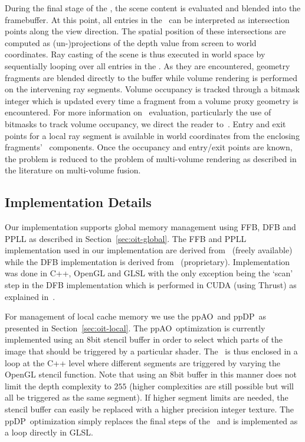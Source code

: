 \documentclass{egpubl}
\newcommand{\ab}{\mbox{A-buffer}}
\newcommand{\stencil}{ppAO}
\newcommand{\dloop}{ppDP}
\begin{document}
During the final stage of the \sResolve, the scene content is evaluated and blended into the framebuffer. 
At this point, all entries in the \bFraglist\ can be interpreted as intersection points along the view direction. 
The spatial position of these intersections are computed as (un-)projections of the depth value from screen to world coordinates. 
Ray casting of the scene is thus executed in world space by sequentially looping over all entries in the \bFraglist. 
As they are encountered, geometry fragments are blended directly to the buffer while volume rendering is performed on the intervening ray segments. 
Volume occupancy is tracked through a bitmask integer which is updated every time a fragment from a volume proxy geometry is encountered. 
For more information on \bFraglist\ evaluation, particularly the use of bitmasks to track volume occupancy, we direct the reader to~\cite{brecheisen08multimodal}. 
Entry and exit points for a local ray segment is available in world coordinates from the enclosing fragments' \ccz\ components. 
Once the occupancy and entry/exit points are known, the problem is reduced to the problem of multi-volume rendering as described in the literature on multi-volume fusion. 


\subsection{Implementation Details}

Our implementation supports global memory management using FFB, DFB and PPLL as described in Section~\ref{sec:oit-global}. The FFB and PPLL implementation used in our implementation are derived from~\cite{Crassin2010} (freely available) while the DFB implementation is derived from~\cite{Maule2012} (proprietary). Implementation was done in C++, OpenGL and GLSL with the only exception being the `scan' step in the DFB implementation which is performed in CUDA (using Thrust) as explained in~\cite{Maule2012}. 

For management of local cache memory we use the \stencil\ and \dloop\ as presented in Section~\ref{sec:oit-local}. 
The \stencil\ optimization is currently implemented using an 8bit stencil buffer in order to select which parts of the image that should be triggered by a particular shader. 
The \sFill\ is thus enclosed in a loop at the C++ level where different segments are triggered by varying the OpenGL stencil function. 
Note that using an $8$bit buffer in this manner does not limit the depth complexity to $255$ (higher complexities are still possible but will all be triggered as the same segment). 
If higher segment limits are needed, the stencil buffer can easily be replaced with a higher precision integer texture. 
The \dloop\ optimization simply replaces the final steps of the \sResolve\ and is implemented as a loop directly in GLSL. 
\end{document}
